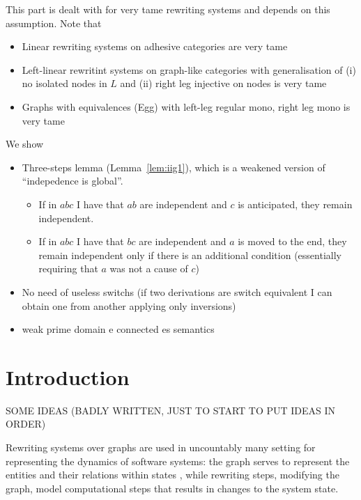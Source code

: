 \documentclass[a4paper,UKenglish,cleveref,pdftex, thm-restate,numberwithinsect]{lipics}
\begin{document}
This part is dealt with for very tame rewriting systems and depends on this assumption. Note that
\begin{itemize}
\item Linear rewriting systems on adhesive categories are very tame
\item Left-linear rewritint systems on graph-like categories with generalisation of (i) no isolated nodes in $L$ and (ii) right leg injective on nodes is very tame
\item Graphs with equivalences (Egg) with left-leg regular mono, right leg mono is very tame
\end{itemize}

We show
\begin{itemize}

  
\item Three-steps lemma (Lemma~\ref{lem:iig1}), which is a weakened version of ``indepedence is global''.
  \begin{itemize}
    
  \item If in $abc$ I have that $ab$ are independent and $c$ is anticipated, they remain independent.
  \item  If in $abc$ I have that $bc$ are independent and $a$ is moved to the end, they remain independent only if there is an additional condition (essentially requiring that $a$ was not a cause of $c$)
  \end{itemize}

  
  
\item No need of useless switchs (if two derivations are switch equivalent I can obtain one from another applying only inversions)

\item weak prime domain e connected es semantics
\end{itemize}
\fi 

\section{Introduction}


SOME IDEAS (BADLY WRITTEN, JUST TO START TO PUT IDEAS IN ORDER)

Rewriting systems over graphs are used in uncountably many setting for
representing the dynamics of software systems: the graph serves to represent
the entities and their relations within states , while rewriting steps,
modifying the graph, model computational steps that results in
changes to the system state.
\end{document}
